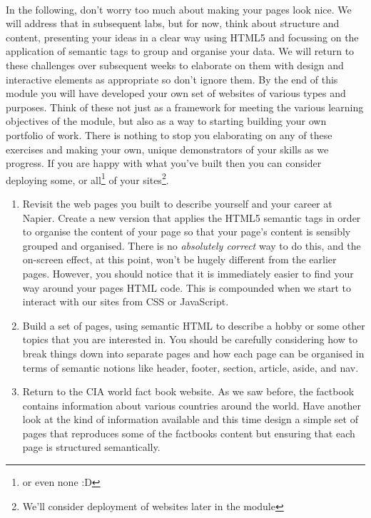 \documentclass[10pt, a4paper]{article}
\begin{document}
\paragraph{} In the following, don't worry too much about making your pages look nice. We will address that in subsequent labs, but for now, think about structure and content, presenting your ideas in a clear way using HTML5 and focussing on the application of semantic tags to group and organise your data. We will return to these challenges over subsequent weeks to elaborate on them with design and interactive elements as appropriate so don't ignore them. By the end of this module you will have developed your own set of websites of various types and purposes. Think of these not just as a framework for meeting the various learning objectives of the module, but also as a way to starting building your own portfolio of work. There is nothing to stop you elaborating on any of these exercises and making your own, unique demonstrators of your skills as we progress. If you are happy with what you've built then you can consider deploying some, or all\footnote{or even none :D} of your sites\footnote{We'll consider deployment of websites later in the module}.
\begin{enumerate}
\item Revisit the web pages you built to describe yourself and your career at Napier. Create a new version that applies the HTML5 semantic tags in order to organise the content of your page so that your page's content is sensibly grouped and organised. There is no \emph{absolutely correct} way to do this, and the on-screen effect, at this point, won't be hugely different from the earlier pages. However, you should notice that it is immediately easier to find your way around your pages HTML code. This is compounded when we start to interact with our sites from CSS or JavaScript.

\item Build a set of pages, using semantic HTML to describe a hobby or some other topics that you are interested in. You should be carefully considering how to break things down into separate pages and how each page can be organised in terms of semantic notions like header, footer, section, article, aside, and nav. 

\item Return to the CIA world fact book website. As we saw before, the factbook contains information about various countries around the world. Have another look at the kind of information available and this time design a simple set of pages that reproduces some of the factbooks content but ensuring that each page is structured semantically.

\end{enumerate}
\end{document}
